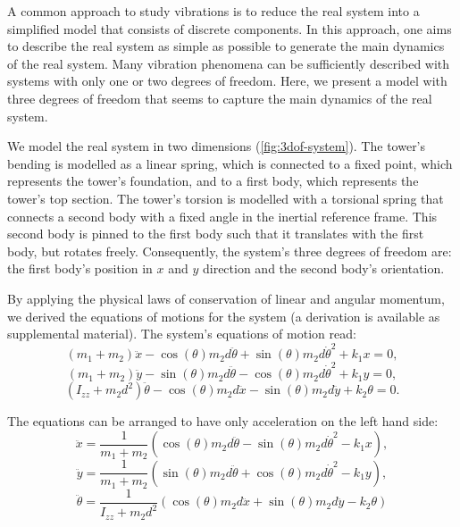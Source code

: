 \documentclass{article}
\begin{document}
A common approach to study vibrations is to reduce the real system into a simplified model that consists of discrete components. In this approach, one aims to describe the real system as simple as possible to generate the main dynamics of the real system. Many vibration phenomena can be sufficiently described with systems with only one or two degrees of freedom. Here, we present a model with three degrees of freedom that seems to capture the main dynamics of the real system.
\par 
We model the real system in two dimensions (\autoref{fig:3dof-system}). The tower's bending is modelled as a linear spring, which is connected to a fixed point, which represents the tower's foundation, and to a first body, which represents the tower's top section. The tower's torsion is modelled with a torsional spring that connects a second body with a fixed angle in the inertial reference frame. This second body is pinned to the first body such that it translates with the first body, but rotates freely. Consequently, the system's three degrees of freedom are: the first body's position in $x$ and $y$ direction and the second body's orientation.
\par 
By applying the physical laws of conservation of linear and angular momentum, we derived the equations of motions for the system (a derivation is available as supplemental material). The system's equations of motion read:
\begin{equation}
    (m_1 + m_2) \ddot{x} - \cos(\theta) m_2 d \ddot{\theta} + \sin(\theta) m_2 d \dot{\theta}^2 + k_1 x = 0,\label{eq:eom-x}
\end{equation}
\begin{equation}
    (m_1 + m_2) \ddot{y} - \sin(\theta) m_2 d \ddot{\theta} - \cos(\theta) m_2 d \dot{\theta}^2 + k_1 y = 0,\label{eq:eom-y}
\end{equation}
\begin{equation}
    (I_{zz} + m_2 d^2)\ddot{\theta} - \cos(\theta) m_2 d \ddot{x} - \sin(\theta)m_2 d \ddot{y} + k_2 \theta = 0.\label{eq:eom-theta}
\end{equation}

The equations can be arranged to have only acceleration on the left hand side:
\begin{equation}
    \ddot{x} = \frac{1}{m_1 + m_2} \left( \cos(\theta) m_2 d \ddot{\theta} - \sin(\theta) m_2 d \dot{\theta}^2 - k_1 x \right),\label{eq:eom2-x}
\end{equation}
\begin{equation}
   \ddot{y} = \frac{1}{m_1 + m_2} \left(\sin(\theta) m_2 d \ddot{\theta} + \cos(\theta) m_2 d \dot{\theta}^2 - k_1 y \right),\label{eq:eom2-y}
\end{equation}
\begin{equation}
    \ddot{\theta} = \frac{1}{I_{zz} + m_2 d^2} \left(\cos(\theta) m_2 d \ddot{x} + \sin(\theta)m_2 d \ddot{y} - k_2 \theta \right) \label{eq:eom2-theta}
\end{equation}
\end{document}
